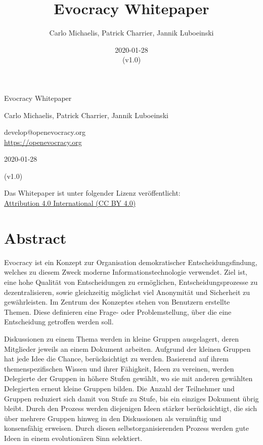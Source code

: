 \documentclass[10pt]{article}
\title{Evocracy Whitepaper}
\author{Carlo Michaelis, Patrick Charrier, Jannik Luboeinski}
\date{2020-01-28\\ (v1.0)}
\begin{document}

\begin{center}

\vspace*{1.5cm}
{\Huge Evocracy Whitepaper}
\vspace*{1.5cm}

{\large Carlo Michaelis, Patrick Charrier, Jannik Luboeinski}

develop@openevocracy.org\\
\href{https://openevocracy.org/}{https://openevocracy.org}
\vspace*{1cm}

{\large 2020-01-28}

(v1.0)
\end{center}

\vspace*{\fill}

\begin{center}
Das Whitepaper ist unter folgender Lizenz veröffentlicht:\\ \href{https://creativecommons.org/licenses/by/4.0/}{Attribution 4.0 International (CC BY 4.0)}
\end{center}

\thispagestyle{empty}
\newpage


\section*{Abstract}

Evocracy ist ein Konzept zur Organisation demokratischer Entscheidungsfindung, welches zu diesem Zweck moderne Informationstechnologie verwendet. Ziel ist, eine hohe Qualität von Entscheidungen zu ermöglichen, Entscheidungsprozesse zu dezentralisieren, sowie gleichzeitig möglichst viel Anonymität und Sicherheit zu gewährleisten. Im Zentrum des Konzeptes stehen von Benutzern erstellte Themen. Diese definieren eine Frage- oder Problemstellung, über die eine Entscheidung getroffen werden soll.

Diskussionen zu einem Thema werden in kleine Gruppen ausgelagert, deren Mitglieder jeweils an einem Dokument arbeiten. Aufgrund der kleinen Gruppen hat jede Idee die Chance, berücksichtigt zu werden. Basierend auf ihrem themenspezifischen Wissen und ihrer Fähigkeit, Ideen zu vereinen, werden Delegierte der Gruppen in höhere Stufen gewählt, wo sie mit anderen gewählten Delegierten erneut kleine Gruppen bilden. Die Anzahl der Teilnehmer und Gruppen reduziert sich damit von Stufe zu Stufe, bis ein einziges Dokument übrig bleibt. Durch den Prozess werden diejenigen Ideen stärker berücksichtigt, die sich über mehrere Gruppen hinweg in den Diskussionen als vernünftig und konsensfähig erweisen. Durch diesen selbstorganisierenden Prozess werden gute Ideen in einem evolutionären Sinn selektiert.
\end{document}
